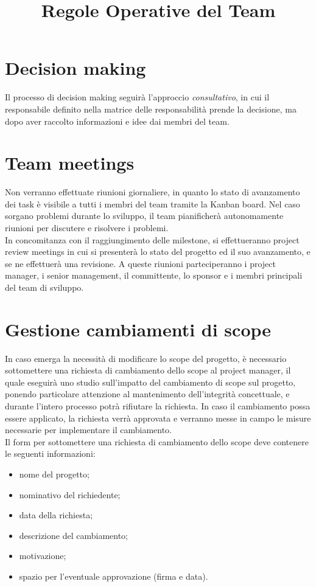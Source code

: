 \documentclass[a4paper,12pt]{article}
\title{\textbf{Regole Operative del Team}}
\author{}
\date{}
\begin{document}
\maketitle
\tableofcontents

\newpage

\section{Decision making}
Il processo di decision making seguirà l'approccio \textit{consultativo}, in cui il responsabile definito nella matrice
delle responsabilità prende la decisione, ma dopo aver raccolto informazioni e idee dai membri del team.

\section{Team meetings}
Non verranno effettuate riunioni giornaliere, in quanto lo stato di avanzamento dei task è visibile a tutti i membri
del team tramite la Kanban board. Nel caso sorgano problemi durante lo sviluppo, il team pianificherà autonomamente
riunioni per discutere e risolvere i problemi.\\
In concomitanza con il raggiungimento delle milestone, si effettueranno project review meetings in cui si presenterà
lo stato del progetto ed il suo avanzamento, e se ne effettuerà una revisione. A queste riunioni parteciperanno i
project manager, i senior management, il committente, lo sponsor e i membri principali del team di sviluppo.

\section{Gestione cambiamenti di scope}
In caso emerga la necessità di modificare lo scope del progetto, è necessario sottomettere una richiesta di cambiamento
dello scope al project manager, il quale eseguirà uno studio sull'impatto del cambiamento di scope sul progetto,
ponendo particolare attenzione al mantenimento dell'integrità concettuale, e durante l'intero processo potrà rifiutare
la richiesta. In caso il cambiamento possa essere applicato, la richiesta verrà approvata e verranno messe in campo le
misure necessarie per implementare il cambiamento.\\
Il form per sottomettere una richiesta di cambiamento dello scope deve contenere le seguenti informazioni:
\begin{itemize}
    \item nome del progetto;
    \item nominativo del richiedente;
    \item data della richiesta;
    \item descrizione del cambiamento;
    \item motivazione;
    \item spazio per l'eventuale approvazione (firma e data).
\end{itemize}
\end{document}
